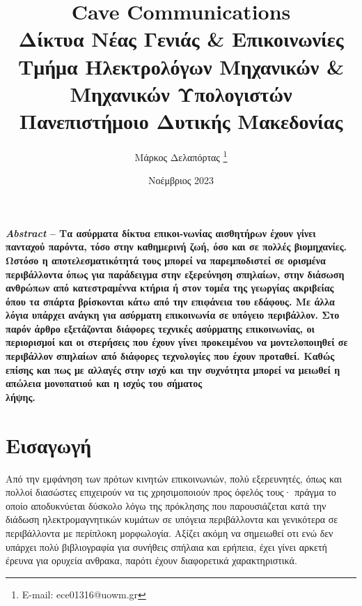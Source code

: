 \documentclass[12pt]{article}
\title{
    \textsf{ Cave Communications}\\
    \textsf{Δίκτυα Νέας Γενιάς \& Επικοινωνίες}\\
    \textsf{\Large Τμήμα Ηλεκτρολόγων Μηχανικών \& Μηχανικών Υπολογιστών}\\
    \textsf{\large Πανεπιστήμοιο Δυτικής Μακεδονίας}
}
\author{\textsf{Μάρκος Δελαπόρτας} \footnote{E-mail: ece01316@uowm.gr}}
\date{\textsf{Νοέμβριος 2023}}
\begin{document}
\maketitle

\begin{multicols*}{2}
    \scriptsize \textbf{ \textit{Abstract} -- Τα ασύρματα δίκτυα επικοι-νωνίας αισθητήρων έχουν γίνει πανταχού παρόντα, τόσο στην καθημερινή ζωή, όσο και σε
        πολλές βιομηχανίες. Ωστόσο η αποτελεσματικότητά τους μπορεί να παρεμποδιστεί σε ορισμένα περιβάλλοντα όπως για παράδειγμα στην εξερεύνηση σπηλαίων, στην
        διάσωση ανθρώπων από κατεστραμέννα κτήρια ή στον τομέα της γεωργίας ακριβείας όπου τα σπάρτα βρίσκονται κάτω από την επιφάνεια του εδάφους. Με άλλα
        λόγια υπάρχει ανάγκη για ασύρματη επικοινωνία σε υπόγειο περιβάλλον. Στο παρόν άρθρο εξετάζονται διάφορες τεχνικές ασύρματης επικοινωνίας, οι
        περιορισμοί και οι στερήσεις που έχουν γίνει προκειμένου να μοντελοποιηθεί σε περιβάλλον σπηλαίων από διάφορες τεχνολογίες που έχουν προταθεί. Καθώς
        επίσης και πως με αλλαγές στην ισχύ και την συχνότητα μπορεί να μειωθεί η απώλεια μονοπατιού και η ισχύς του σήματος\\
        λήψης. }

    \section{\normalsize \textsf{Εισαγωγή}}
        Από την εμφάνηση των πρότων κινητών επικοινωνιών, πολύ εξερευνητές, όπως και πολλοί διασώστες επιχειρούν να τις χρησιμοποιούν προς όφελός τους· πράγμα
        το οποίο αποδυκνύεται δύσκολο λόγω της πρόκλησης που παρουσιάζεται κατά την διάδωση ηλεκτρομαγνητικών κυμάτων σε υπόγεια περιβάλλοντα και γενικότερα σε
        περιβάλλοντα με περίπλοκη μορφωλογία. Αξίζει ακόμη να σημειωθεί οτι ενώ δεν υπάρχει πολύ βιβλιογραφία για συνήθεις σπήλαια και ερήπεια, έχει γίνει
        αρκετή έρευνα για ορυχεία ανθρακα, παρότι έχουν διαφορετικά χαρακτηριστικά.
    

\end{multicols*}
\end{document}
